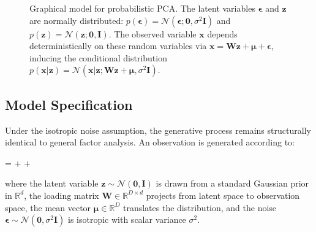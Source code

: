 \begin{figure}[ht]
\begin{center}
\caption{Graphical model for probabilistic PCA. The latent variables $\boldsymbol{\epsilon}$ and $\mathbf{z}$ are normally distributed: $p(\boldsymbol{\epsilon})=\mathcal{N}(\boldsymbol{\epsilon}; \mathbf{0}, \sigma^2\mathbf{I})$ and $p(\mathbf{z})=\mathcal{N}(\mathbf{z}; \mathbf{0}, \mathbf{I})$. The observed variable $\mathbf{x}$ depends deterministically on these random variables via $\mathbf{x}=\mathbf{W}\mathbf{z}+\boldsymbol{\mu}+\boldsymbol{\epsilon}$, inducing the conditional distribution $p(\mathbf{x}|\mathbf{z})=\mathcal{N}(\mathbf{x}|\mathbf{z};\mathbf{W}\mathbf{z}+\boldsymbol{\mu}, \sigma^2\mathbf{I})$.
}\label{ppca}
\end{center}
\end{figure}

\subsection*{Model Specification}

Under the isotropic noise assumption, the generative process remains structurally identical to general factor analysis. An observation is generated according to:
\begin{myequation}
 =  + \boldsymbol{\mu} + \boldsymbol{\epsilon}
\end{myequation}

where the latent variable $\mathbf{z} \sim \mathcal{N}(\mathbf{0}, \mathbf{I})$ is drawn from a standard Gaussian prior in $\mathbb{R}^d$, the loading matrix $\mathbf{W} \in \mathbb{R}^{D \times d}$ projects from latent space to observation space, the mean vector $\boldsymbol{\mu} \in \mathbb{R}^D$ translates the distribution, and the noise $\boldsymbol{\epsilon} \sim \mathcal{N}(\mathbf{0}, \sigma^2\mathbf{I})$ is isotropic with scalar variance $\sigma^2$.

